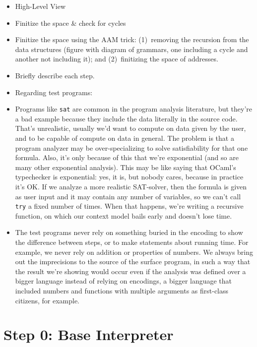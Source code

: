 \documentclass[12pt, oneside]{book}
\begin{document}
\begin{itemize}
  \item High-Level View
  \item Finitize the space \& check for cycles
  \item Finitize the space using the AAM trick: (1)~removing the recursion from the data structures (figure with diagram of grammars, one including a cycle and another not including it); and (2)~finitizing the space of addresses.
  \item Briefly describe each step.
\end{itemize}

\begin{itemize}
  \item Regarding test programs:
  \item Programs like \texttt{sat} are common in the program analysis literature, but they’re a bad example because they include the data literally in the source code. That’s unrealistic, usually we’d want to compute on data given by the user, and to be capable of compute on data in general. The problem is that a program analyzer may be over-specializing to solve satisfiability for that one formula. Also, it’s only because of this that we’re exponential (and so are many other exponential analysis). This may be like saying that OCaml’s typechecker is exponential: yes, it is, but nobody cares, because in practice it’s OK. If we analyze a more realistic SAT-solver, then the formula is given as user input and it may contain any number of variables, so we can’t call \texttt{try} a fixed number of times. When that happens, we’re writing a recursive function, on which our context model bails early and doesn’t lose time.
  \item The test programs never rely on something buried in the encoding to show the difference between steps, or to make statements about running time. For example, we never rely on addition or properties of numbers. We always bring out the imprecisions to the source of the surface program, in such a way that the result we’re showing would occur even if the analysis was defined over a bigger language instead of relying on encodings, a bigger language that included numbers and functions with multiple arguments as first-class citizens, for example.
\end{itemize}

\section{Step 0: Base Interpreter}
\label{section:step-0--base-interpreter}
\end{document}
